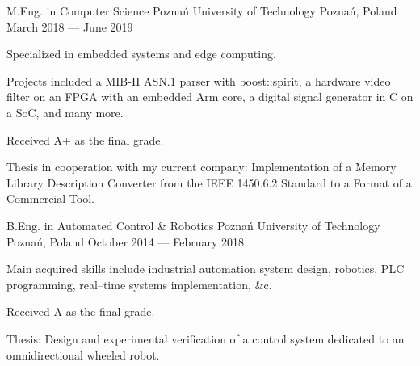\documentclass[11pt, a4paper]{awesome-cv}
\begin{document}
\begin{cventries}
  \cventry
    {M.Eng. in Computer Science} %
    {Poznań University of Technology} %
    {Poznań, Poland} %
    {March 2018 --- June 2019} %
    {
      \begin{cvitems} %
      \item {Specialized in embedded systems and edge computing.}
      \item {Projects included a MIB-II ASN.1 parser with boost::spirit, a hardware video filter on an FPGA with an embedded Arm core, a digital signal generator in C on a SoC, and many more.}
      \item {Received A+ as the final grade.}
      \item {Thesis in cooperation with my current company: Implementation of a Memory Library Description Converter from the IEEE 1450.6.2 Standard to a Format of a Commercial Tool.}
      \end{cvitems}
    }

  \cventry
    {B.Eng. in Automated Control \& Robotics} %
    {Poznań University of Technology} %
    {Poznań, Poland} %
    {October 2014 --- February 2018} %
    {
      \begin{cvitems} %
      \item {Main acquired skills include industrial automation system design, robotics, PLC programming, real--time systems implementation, \&c.}
      \item {Received A as the final grade.}
      \item {Thesis: Design and experimental verification of a control system dedicated to an omnidirectional wheeled robot.}
      \end{cvitems}
    }
\end{cventries}

\end{document}
